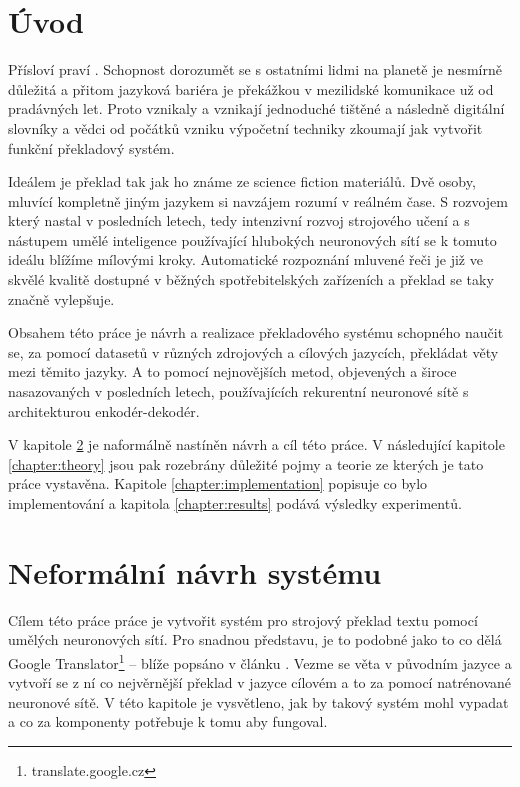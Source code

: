 \chapter{Úvod}
Přísloví praví . Schopnost dorozumět se s ostatními lidmi na planetě je nesmírně důležitá a přitom jazyková bariéra je překážkou v mezilidské komunikace už od pradávných let. Proto vznikaly a vznikají jednoduché tištěné a následně digitální slovníky a vědci od počátků vzniku výpočetní techniky zkoumají jak vytvořit funkční překladový systém.

Ideálem je překlad tak jak ho známe ze science fiction materiálů. Dvě osoby, mluvící kompletně jiným jazykem si navzájem rozumí v reálném čase. S rozvojem který nastal v posledních letech, tedy intenzivní rozvoj strojového učení a s nástupem umělé inteligence používající hlubokých neuronových sítí se k tomuto ideálu blížíme mílovými kroky. Automatické rozpoznání mluvené řeči je již ve skvělé kvalitě dostupné v běžných spotřebitelských zařízeních a překlad se taky značně vylepšuje.

Obsahem této práce je návrh a realizace překladového systému schopného naučit se, za pomocí datasetů v různých zdrojových a cílových jazycích, překládat věty mezi těmito jazyky. A to pomocí nejnovějších metod, objevených a široce nasazovaných v posledních letech, používajících rekurentní neuronové sítě s architekturou enkodér-dekodér.

V kapitole \ref{chapter:draft} je naformálně nastíněn návrh a cíl této práce. V následující kapitole \ref{chapter:theory} jsou pak rozebrány důležité pojmy a teorie ze kterých je tato práce vystavěna. Kapitole \ref{chapter:implementation} popisuje co bylo implementování a kapitola \ref{chapter:results} podává výsledky experimentů.

\chapter{Neformální návrh systému} \label{chapter:draft}
Cílem této práce práce je vytvořit systém pro strojový překlad textu pomocí umělých neuronových sítí. Pro snadnou představu, je to podobné jako to co dělá Google Translator\footnote{translate.google.cz} -- blíže popsáno v článku \cite{googleBridgingGap}. Vezme se věta v původním jazyce a vytvoří se z ní co nejvěrnější překlad v jazyce cílovém a to za pomocí natrénované neuronové sítě. V této kapitole je vysvětleno, jak by takový systém mohl vypadat a co za komponenty potřebuje k tomu aby fungoval.

